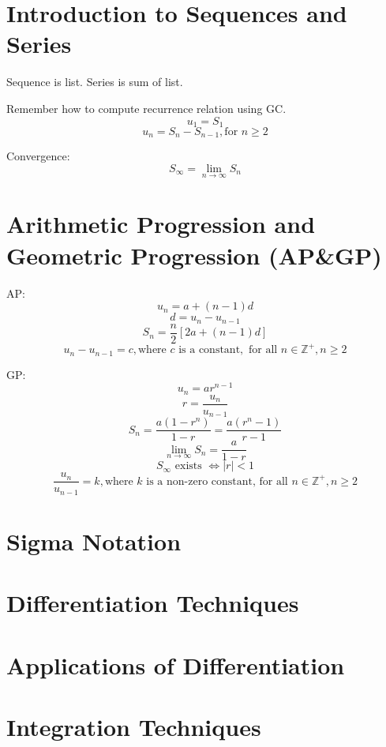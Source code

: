 \documentclass[a4paper]{article}
\begin{document}
\setcounter{section}{5}
\renewcommand{\thesection}{6A}
\section{Introduction to Sequences and Series}

Sequence is list.
Series is sum of list.

Remember how to compute recurrence relation using GC.
\[
u_1 = S_1
\]
\[
u_n = S_n - S_{n-1}, \text{for } n \ge 2
\]

Convergence: 
\[
S_{\infty} = \lim_{n \to \infty} S_n
\]

\renewcommand{\thesection}{6B}
\section{Arithmetic Progression and Geometric Progression (AP\&GP)}

AP:
\[
u_n = a + (n-1)d
\]
\[
d = u_n - u_{n-1}
\]
\[
S_n = \frac{n}{2}[2a + (n-1)d]
\]
\[
u_n - u_{n-1} = c, \text{where } c \text{ is a constant}, \text{ for all } n \in \mathbb{Z}^{+}, n \ge 2
\]

GP:
\[
u_n = ar^{n-1}
\]
\[
r = \frac{u_n}{u_{n-1}}
\]
\[
S_n = \frac{ a ( 1 - r^n ) }{ 1 - r } = \frac{ a( r^n - 1 ) }{ r - 1 }
\]
\[
\lim_{ n \to \infty } S_n = \frac{a}{1-r}
\]
\[
S_\infty \text{ exists } \iff |r| < 1
\]
\[
\frac{u_n}{u_{n-1}} = k, \text{where } k \text{ is a non-zero constant, for all } n \in \mathbb{Z}^{+} , n \ge 2 
\]


\renewcommand{\thesection}{6C}
\section{Sigma Notation}

\renewcommand{\thesection}{\arabic{section}}
\setcounter{section}{6}

\section{Differentiation Techniques}

\section{Applications of Differentiation}

\section{Integration Techniques}
\end{document}
